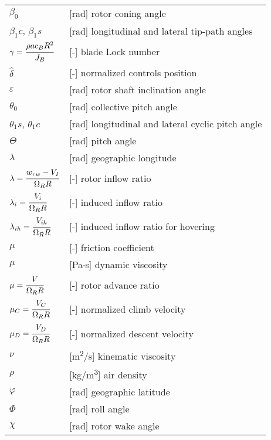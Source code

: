 \begin{longtable}[l]{ l p{} }
  $\beta_0$                                    & [rad] rotor coning angle \\
  $\beta_1c$, $\beta_1s$                       & [rad] longitudinal and lateral tip-path angles \\
  $\gamma=\cfrac{\rho a c_B R^2}{J_B}$         & [-] blade Lock number \\
  $\hat \delta$                                & [-] normalized controls position \\
  $\varepsilon$                                & [rad] rotor shaft inclination angle \\
  $\theta_0$                                   & [rad] collective pitch angle \\
  $\theta_1s$, $\theta_1c$                     & [rad] longitudinal and lateral cyclic pitch angle \\
  $\Theta$                                     & [rad] pitch angle \\
  $\lambda$                                    & [rad] geographic longitude \\
  $\lambda=\cfrac{w_{rw} - V_I}{\Omega_R R}$   & [-] rotor inflow ratio \\
  $\lambda_i=\cfrac{V_i}{\Omega_R R}$          & [-] induced inflow ratio \\
  $\lambda_{ih}=\cfrac{V_{ih}}{\Omega_R R}$    & [-] induced inflow ratio for hovering \\
  $\mu$                                        & [-] friction coefficient \\
  $\mu$                                        & [Pa$\cdot$s] dynamic viscosity \\
  $\mu=\cfrac{V}{\Omega_R R}$                  & [-] rotor advance ratio \\
  $\mu_C=\cfrac{V_C}{\Omega_R R}$              & [-] normalized climb velocity \\
  $\mu_D=\cfrac{V_D}{\Omega_R R}$              & [-] normalized descent velocity \\
  $\nu$                                        & [m\textsuperscript{2}/s] kinematic viscosity \\
  $\rho$                                       & [kg/m\textsuperscript{3}] air density \\
  $\varphi$                                    & [rad] geographic latitude \\
  $\Phi$                                       & [rad] roll angle \\
  $\chi$                                       & [rad] rotor wake angle \\

\end{longtable}
